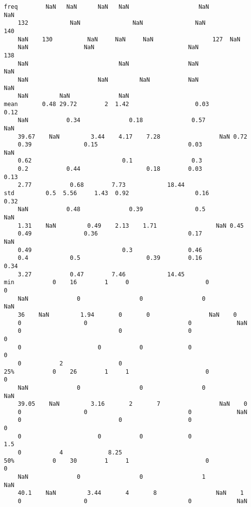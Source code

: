 \documentclass[11pt]{article}
\begin{document}
\begin{Verbatim}[tabsize=4]
freq        NaN   NaN      NaN   NaN                    NaN               NaN
	132            NaN               NaN               NaN           140
	NaN    130          NaN     NaN     NaN                 127  NaN
	NaN                NaN                           NaN             138
	NaN                          NaN                 NaN                         NaN
	NaN                    NaN         NaN           NaN                  NaN
	NaN         NaN              NaN
mean       0.48 29.72        2  1.42                   0.03              0.12
	NaN           0.34              0.18              0.57           NaN
	39.67    NaN         3.44    4.17    7.28                 NaN 0.72
	0.39               0.15                          0.03             NaN
	0.62                          0.1                 0.3
	0.2           0.44                   0.18        0.03          0.13
	2.77           0.68        7.73            18.44
std         0.5  5.56     1.43  0.92                   0.16              0.32
	NaN           0.48              0.39               0.5           NaN
	1.31    NaN         0.49    2.13    1.71                 NaN 0.45
	0.49               0.36                          0.17             NaN
	0.49                          0.3                0.46
	0.4            0.5                   0.39        0.16          0.34
	3.27           0.47        7.46            14.45
min           0    16        1     0                      0                 0
	NaN              0                 0                 0           NaN
	36    NaN         1.94       0       0                 NaN    0
	0                  0                             0             NaN
	0                            0                   0                           0
	0                      0           0             0                    0
	0           2                0
25%           0    26        1     1                      0                 0
	NaN              0                 0                 0           NaN
	39.05    NaN         3.16       2       7                 NaN    0
	0                  0                             0             NaN
	0                            0                   0                           0
	0                      0           0             0                  1.5
	0           4             8.25
50%           0    30        1     1                      0                 0
	NaN              0                 0                 1           NaN
	40.1    NaN         3.44       4       8                 NaN    1
	0                  0                             0             NaN

\end{Verbatim}
\end{document}

